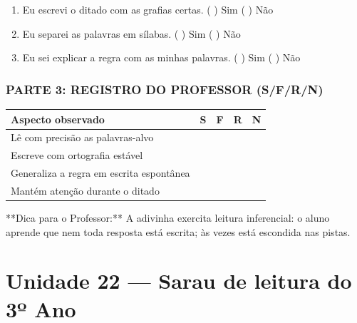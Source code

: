 \begin{exercicio}
\begin{enumerate}[label=\alph*)]
  \item Eu escrevi o ditado com as grafias certas.  \quad ( ) Sim   ( ) Não

  \item Eu separei as palavras em sílabas.  \quad ( ) Sim   ( ) Não

  \item Eu sei explicar a regra com as minhas palavras.  \quad ( ) Sim   ( ) Não

\end{enumerate}

\subsection*{PARTE 3: REGISTRO DO PROFESSOR (S/F/R/N)}

\begin{center}
\renewcommand{\arraystretch}{1.4}
\begin{tabular}{@{}p{9cm}cccc@{}}
\toprule
Aspecto observado & S & F & R & N \\
\midrule
Lê com precisão as palavras-alvo & & & & \\
Escreve com ortografia estável & & & & \\
Generaliza a regra em escrita espontânea & & & & \\
Mantém atenção durante o ditado & & & & \\
\bottomrule\end{tabular}\end{center}

\end{exercicio}

\begin{dica}
**Dica para o Professor:** A adivinha exercita leitura inferencial: o aluno aprende que nem toda resposta está escrita; às vezes está escondida nas pistas.
\end{dica}


\chapter{Unidade 22 --- Sarau de leitura do 3º Ano}


